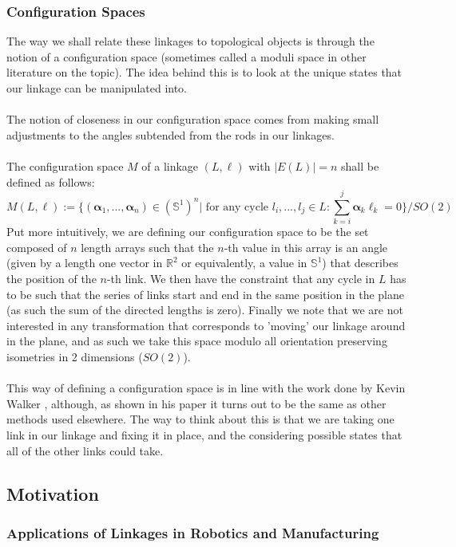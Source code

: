\documentclass{article}
\begin{document}
\subsubsection{Configuration Spaces}

The way we shall relate these linkages to topological objects is through the notion of a configuration space (sometimes called a moduli space in other literature on the topic). The idea behind this is to look at the unique states that our linkage can be manipulated into. \\\\ The notion of closeness in our configuration space comes from making small adjustments to the angles subtended from the rods in our linkages. \\\\ The configuration space $M$ of a linkage $(L,\ell )$ with $|E(L)| = n$ shall be defined as follows:
$$ M(L,\ell) := \{(\boldsymbol\alpha_1,..., \boldsymbol\alpha_n) \in (\mathbb S^1)^n | \textrm{ for any cycle } l_i, ..., l_j \in L: \sum_{k=i}^j \boldsymbol\alpha_k \ell_k = 0 \} / SO(2)$$
Put more intuitively, we are defining our configuration space to be the set composed of $n$ length arrays such that the $n$-th value in this array is an angle (given by a length one vector in $\mathbb R^2$ or equivalently, a value in $\mathbb S^1$) that describes the position of the $n$-th link. We then have the constraint that any cycle in $L$ has to be such that the series of links start and end in the same position in the plane (as such the sum of the directed lengths is zero). Finally we note that we are not interested in any transformation that corresponds to 'moving' our linkage around in the plane, and as such we take this space modulo all orientation preserving isometries in 2 dimensions ($SO(2)$). \\\\ This way of defining a configuration space is in line with the work done by Kevin Walker \cite{kevinwalker}, although, as shown in his paper it turns out to be the same as other methods used elsewhere. The way to think about this is that we are taking one link in our linkage and fixing it in place, and the considering possible states that all of the other links could take.

\subsection{Motivation}

\subsubsection{Applications of Linkages in Robotics and Manufacturing}
\end{document}
